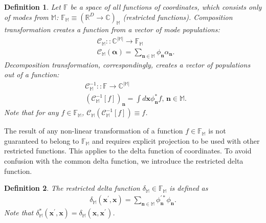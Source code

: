 \documentclass[12pt,aip,jmp,amssymb,amsmath]{revtex4-1}
\newtheorem{definition}{Definition}
\begin{document}
\begin{definition}
    Let $\mathbb{F}$ be a space of all functions of coordinates, which consists only of modes from $\mathbb{M}$: $\mathbb{F}_{\mathbb{M}} \equiv (\mathbb{R}^D \rightarrow \mathbb{C})_{\mathbb{M}}$ (restricted functions).
    Composition transformation creates a function from a vector of mode populations:
    \begin{eqnarray*}
        & \mathcal{C}_{\mathbb{M}} :: \mathbb{C}^{|\mathbb{M}|} \rightarrow \mathbb{F}_{\mathbb{M}} \\
        & \mathcal{C}_{\mathbb{M}}(\boldsymbol{\alpha}) = \sum_{\boldsymbol{n} \in \mathbb{M}} \phi_{\boldsymbol{n}} \alpha_{\boldsymbol{n}}.
    \end{eqnarray*}
    Decomposition transformation, correspondingly, creates a vector of populations out of a function:
    \begin{eqnarray*}
        & \mathcal{C}_{\mathbb{M}}^{-1} :: \mathbb{F} \rightarrow \mathbb{C}^{|\mathbb{M}|} \\
        & (\mathcal{C}_{\mathbb{M}}^{-1}[f])_{\boldsymbol{n}}
        = \int d\boldsymbol{x} \phi_{\boldsymbol{n}}^* f,\,{\boldsymbol{n}} \in \mathbb{M}.
    \end{eqnarray*}
    Note that for any $f \in \mathbb{F}_{\mathbb{M}}$, $\mathcal{C}_{\mathbb{M}}(\mathcal{C}_{\mathbb{M}}^{-1}[f]) \equiv f$.
\end{definition}

The result of any non-linear transformation of a function $f \in \mathbb{F}_{\mathbb{M}}$ is not guaranteed to belong to $\mathbb{F}_{\mathbb{M}}$ and requires explicit projection to be used with other restricted functions.
This applies to the delta function of coordinates.
To avoid confusion with the common delta function, we introduce the restricted delta function.

\begin{definition}
\label{def:func-calculus:restricted-delta}
    The restricted delta function $\delta_{\mathbb{M}} \in \mathbb{F}_{\mathbb{M}}$ is defined as
    \begin{eqnarray*}
        \delta_{\mathbb{M}}(\boldsymbol{x}^\prime, \boldsymbol{x})
        = \sum_{\boldsymbol{n} \in \mathbb{M}} \phi_{\boldsymbol{n}}^{\prime*} \phi_{\boldsymbol{n}}.
    \end{eqnarray*}
    Note that $\delta_{\mathbb{M}}^*(\boldsymbol{x}^\prime, \boldsymbol{x}) = \delta_{\mathbb{M}}(\boldsymbol{x}, \boldsymbol{x}^\prime)$.
\end{definition}
\end{document}
